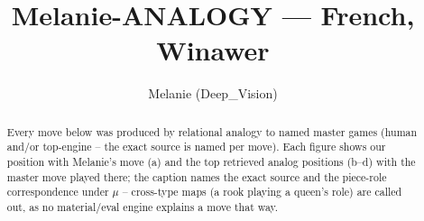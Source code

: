\documentclass[11pt]{article}
\title{Melanie-ANALOGY — French, Winawer}
\author{Melanie (Deep\_Vision)}
\date{}
\begin{document}
\maketitle

\begin{abstract}Every move below was produced by relational analogy to named master games (human and/or top-engine -- the exact source is named per move). Each figure shows our position with Melanie's move (a) and the top retrieved analog positions (b--d) with the master move played there; the caption names the exact source and the piece-role correspondence under $\mu$ -- cross-type maps (a rook playing a queen's role) are called out, as no material/eval engine explains a move that way.\end{abstract}

\begin{figure}[p]\centering
\begin{subfigure}{0.46\textwidth}\centering
\resizebox{\linewidth}{!}{%
\newchessgame
\chessboard[
  setfen={rnbqk2r/pp2nppp/4p3/2ppP3/3P4/P1P5/2P2PPP/R1BQKBNR w KQkq - 1 7},
  showmover=false,
  pgfstyle=straightmove, color=movearrow, markmove={d4-c5}
]}
\caption{}
\end{subfigure}\hfill
\begin{subfigure}{0.46\textwidth}\centering
\resizebox{\linewidth}{!}{%
\newchessgame
\chessboard[
  setfen={r1bqkbnr/2p2ppp/p1pp4/4p3/3PP3/5N2/PPP2PPP/RNBQK2R b KQkq - 0 6},
  showmover=false,
  pgfstyle=straightmove, color=movearrow, markmove={e5-d4}
]}
\caption{}
\end{subfigure}
\\[4pt]
\begin{subfigure}{0.46\textwidth}\centering
\resizebox{\linewidth}{!}{%
\newchessgame
\chessboard[
  setfen={rnb1k1nr/p2q1ppp/1p2p3/2ppP3/3P3P/P1P5/2P2PP1/R1BQKBNR w KQkq - 0 8},
  showmover=false,
  pgfstyle=straightmove, color=movearrow, markmove={a3-a4}
]}
\caption{}
\end{subfigure}\hfill
\begin{subfigure}{0.46\textwidth}\centering
\resizebox{\linewidth}{!}{%
\newchessgame
\chessboard[
  setfen={rnb1k1nr/p2q1ppp/1p2p3/2ppP3/3P3P/P1P5/2P2PP1/R1BQKBNR w KQkq - 0 8},
  showmover=false,
  pgfstyle=straightmove, color=movearrow, markmove={d1-g4}
]}
\caption{}
\end{subfigure}

\end{figure}
\end{document}
